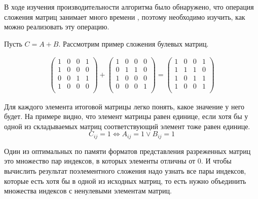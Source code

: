 В ходе изучения производительности алгоритма было обнаружено, что операция сложения матриц занимает много времени
, поэтому
необходимо изучить, как можно реализовать эту операцию.

Пусть $C = A + B$. Рассмотрим пример сложения булевых матриц.

\begin{align*}
\begin{pmatrix}
  1 & 0 & 0 & 1  \\
  1 & 0 & 0 & 0  \\
  0 & 0 & 1 & 1  \\
  1 & 0 & 0 & 0  \\
\end{pmatrix}
+
\begin{pmatrix}
  1 & 0 & 0 & 0  \\
  0 & 1 & 1 & 0  \\
  1 & 0 & 0 & 0  \\
  0 & 0 & 0 & 1  \\
\end{pmatrix}
=
\begin{pmatrix}
  1 & 0 & 0 & 1  \\
  1 & 1 & 1 & 0  \\
  1 & 0 & 1 & 1  \\
  1 & 0 & 0 & 1  \\
\end{pmatrix}
\end{align*}

 Для каждого элемента итоговой матрицы легко понять, какое значение у него будет. На примере видно, что элемент матрицы равен единице, если хотя бы у одной из складываемых матриц соответствующий элемент тоже равен единице.
$$
C_{ij} = 1
\Longleftrightarrow
A_{ij} = 1 \lor B_{ij} = 1
$$

Один из оптимальных по памяти форматов представления разреженных матриц это множество пар индексов, в которых элементы отличны от 0. И чтобы вычислить результат поэлементного сложения надо узнать все пары индексов, которые есть хотя бы в одной из исходных матриц, то есть нужно объединить множества индексов с ненулевыми элементам матриц.
